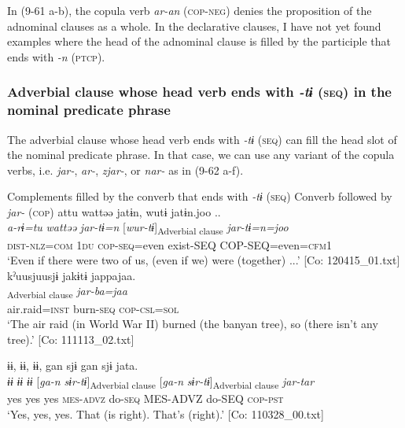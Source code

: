In (9-61 a-b), the copula verb \textit{ar-an} (\textsc{cop}-\textsc{neg}) denies the proposition of the adnominal clauses as a whole. In the declarative clauses, I have not yet found examples where the head of the adnominal clause is filled by the participle that ends with \textit{{}-n} (\textsc{ptcp}).

\subsubsection{Adverbial clause whose head verb ends with \textit{{}-tɨ} (\textsc{seq}) in the nominal predicate phrase}\label{sec:9.3.2.2}

The adverbial clause whose head verb ends with \textit{{}-tɨ} (\textsc{seq}) can fill the head slot of the nominal predicate phrase. In that case, we can use any variant of the copula verbs, i.e. \textit{jar-}, \textit{ar-}, \textit{zjar-}, or \textit{nar-} as in (9-62 a-f).

\ea   Complements filled by the converb that ends with \textit{{}-tɨ} (\textsc{seq}) \label{ex:9.62}
 \exi Converb followed by \textit{jar-} (\textsc{cop})
\ea %
  \glll   attu  wattəə  jatɨn,  wutɨ   jatɨn.joo ..\\
      \textit{a-rɨ=tu}  \textit{wattəə}  \textit{jar-tɨ=n}  [\textit{wur-tɨ}]\textsubscript{Adverbial clause}    \textit{jar-tɨ=n=joo}\\
      \textsc{dist}-\textsc{nlz}=\textsc{com}  1\textsc{du}  \textsc{cop}-\textsc{seq}=even  exist-SEQ    COP-SEQ=even=\textsc{cfm}1\\
      \glt       ‘Even if there were two of us, (even if we) were (together) ...’ [Co: 120415\_01.txt]
\ex %
    \glll  {\textbar}kˀuusjuu{\textbar}sjɨ  jakɨtɨ  jappajaa.\\
      [\textit{kˀuusjuu=sjɨ}  \textit{jakɨr-tɨ}]\textsubscript{Adverbial clause}  \textit{jar-ba=jaa}\\
      air.raid=\textsc{inst}  burn-\textsc{seq}  \textsc{cop}-\textsc{csl}=\textsc{sol}\\
      \glt       ‘The air raid (in World War II) burned (the banyan tree), so (there isn’t any tree).’ [Co: 111113\_02.txt]

\ex %
      \glll ɨɨ,  ɨɨ,  ɨɨ,  gan  sjɨ  gan   sjɨ  jata.\\
      \textit{ɨɨ}  \textit{ɨɨ}  \textit{ɨɨ}  [\textit{ga-n}  \textit{sɨr-tɨ}]\textsubscript{Adverbial clause}  [\textit{ga-n}  \textit{sɨr-tɨ}]\textsubscript{Adverbial clause}  \textit{jar-tar}\\
      yes  yes  yes  \textsc{mes}-\textsc{advz}  do-\textsc{seq}  MES-ADVZ       do-SEQ  \textsc{cop}-\textsc{pst}\\
      \glt   ‘Yes, yes, yes. That (is right). That’s (right).’   [Co: 110328\_00.txt]

